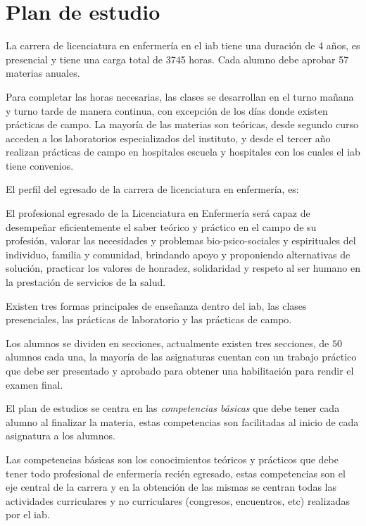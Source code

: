 \section{Plan de estudio}
\label{sec:plan_estudio}

La carrera de licenciatura en enfermería en el \Gls{iab} tiene una duración de 4
años, es presencial y tiene una carga total de 3745 horas. Cada alumno debe
aprobar 57 materias anuales.

Para completar las horas necesarias, las clases se desarrollan en el turno
mañana y turno tarde de manera continua, con excepción de los días donde existen
prácticas de campo. La mayoría de las materias son teóricas, desde segundo curso
acceden a los laboratorios especializados del instituto, y desde el tercer año
realizan prácticas de campo en hospitales escuela y hospitales con los cuales el
\Gls{iab} tiene convenios.

El perfil del egresado de la carrera de licenciatura en enfermería,
es\cite{iab:enfermeria}:

\begin{displayquote}

El profesional egresado de la Licenciatura en Enfermería será capaz de
desempeñar eficientemente el saber teórico y práctico en el campo de su
profesión, valorar las necesidades y problemas bio-psico-sociales y espirituales
del individuo, familia y comunidad, brindando apoyo y proponiendo alternativas
de solución, practicar los valores de honradez, solidaridad y respeto al ser
humano en la prestación de servicios de la salud.

\end{displayquote}

Existen tres formas principales de enseñanza dentro del \Gls{iab}, las clases
presenciales, las prácticas de laboratorio y las prácticas de campo.

Los alumnos se dividen en secciones, actualmente existen tres secciones, de $50$
alumnos cada una, la mayoría de las asignaturas cuentan con un trabajo práctico
que debe ser presentado y aprobado para obtener una habilitación para rendir el
examen final.

El plan de estudios se centra en las \emph{competencias básicas} que debe tener
cada alumno al finalizar la materia, estas competencias son facilitadas al
inicio de cada asignatura a los alumnos.

Las competencias básicas son los conocimientos teóricos y prácticos que debe
tener todo profesional de enfermería recién egresado, estas competencias son el
eje central de la carrera y en la obtención de las mismas se centran todas las
actividades curriculares y no curriculares (congresos, encuentros, etc)
realizadas por el \Gls{iab}.
